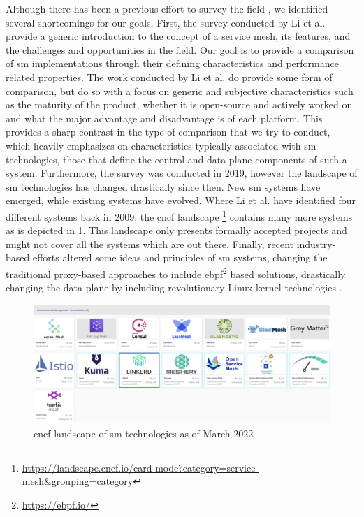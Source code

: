 Although there has been a previous effort to survey the field \cite{service-mesh-survey}, we identified several shortcomings for our goals. First, the survey conducted by Li et al. provide a generic introduction to the concept of a service mesh, its features, and the challenges and opportunities in the field. Our goal is to provide a comparison of \gls{sm} implementations through their defining characteristics and performance related properties. The work conducted by Li et al. do provide some form of comparison, but do so with a focus on generic and subjective characteristics such as the maturity of the product, whether it is open-source and actively worked on and what the major advantage and disadvantage is of each platform. This provides a sharp contrast in the type of comparison that we try to conduct, which heavily emphasizes on characteristics typically associated with  \gls{sm} technologies, those that define the control and data plane components of such a system. Furthermore, the survey was conducted in 2019, however the landscape of \gls{sm} technologies has changed drastically since then. New \gls{sm} systems have emerged, while existing systems have evolved. Where Li et al. \cite{service-mesh-survey} have identified four different systems back in 2009, the \gls{cncf} landscape \cite{cncf-landscape}\footnote{\url{https://landscape.cncf.io/card-mode?category=service-mesh&grouping=category}} contains many more systems as is depicted in \cref{fig:cncf-landscape-sm}. This landscape only presents formally accepted projects and might not cover all the systems which are out there. Finally, recent industry-based efforts altered some ideas and principles of \gls{sm} systems, changing the traditional proxy-based approaches to include  \gls{ebpf}\footnote{\url{https://ebpf.io/}} based solutions, drastically changing the data plane by including revolutionary Linux kernel technologies \cite{istio-merbridge, cilium-mesh}.


\begin{figure}[t]
    \centering
    \includegraphics[width=0.9\linewidth]{3_systems_survey/figures/cncf-landscape-service-mesh}
    \caption{\gls{cncf} landscape of \gls{sm} technologies as of March 2022}
    \label{fig:cncf-landscape-sm}
\end{figure}

